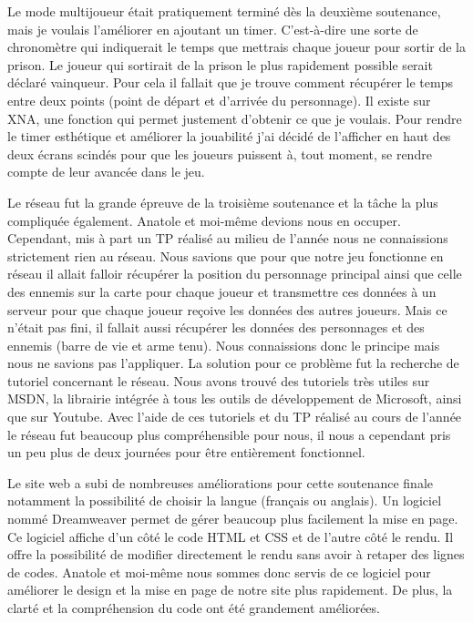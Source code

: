 \documentclass[12pt]{article}
\begin{document}
Le mode multijoueur était pratiquement terminé dès la deuxième soutenance, mais je voulais l’améliorer en ajoutant un timer. C’est-à-dire une sorte de chronomètre qui indiquerait le temps que mettrais chaque joueur pour sortir de la prison. Le joueur qui sortirait de la prison le plus rapidement possible serait déclaré vainqueur. Pour cela il fallait que je trouve comment récupérer le temps entre deux points (point de départ et d’arrivée du personnage). Il existe sur XNA, une fonction qui permet justement d’obtenir ce que je voulais. Pour rendre le timer esthétique et améliorer la jouabilité j’ai décidé de l’afficher en haut des deux écrans scindés pour que les joueurs puissent à, tout moment, se rendre compte de leur avancée dans le jeu.

Le réseau fut la grande épreuve de la troisième soutenance et la tâche la plus compliquée également. Anatole et moi-même devions nous en occuper. Cependant, mis à part un TP réalisé au milieu de l’année nous ne connaissions strictement rien au réseau. Nous savions que pour que notre jeu fonctionne en réseau il allait falloir récupérer la position du personnage principal ainsi que celle des ennemis sur la carte pour chaque joueur et transmettre ces données à un serveur pour que chaque joueur reçoive les données des autres joueurs. Mais ce n’était pas fini, il fallait aussi récupérer les données des personnages et des ennemis (barre de vie et arme tenu). Nous connaissions donc le principe mais nous ne savions pas l’appliquer. La solution pour ce problème fut la recherche de tutoriel concernant le réseau. Nous avons trouvé des tutoriels très utiles sur MSDN, la librairie intégrée à tous les outils de développement de Microsoft, ainsi que sur Youtube. Avec l’aide de ces tutoriels et du TP réalisé au cours de l’année le réseau fut beaucoup plus compréhensible pour nous, il nous a cependant pris un peu plus de deux journées pour être entièrement fonctionnel.

Le site web a subi de nombreuses améliorations pour cette soutenance finale notamment la possibilité de choisir la langue (français ou anglais). Un logiciel nommé Dreamweaver permet de gérer beaucoup plus facilement la mise en page. Ce logiciel affiche d’un côté le code HTML et CSS et de l’autre côté le rendu. Il offre la possibilité de modifier directement le rendu sans avoir à retaper des lignes de codes. Anatole et moi-même nous sommes donc servis de ce logiciel pour améliorer le design et la mise en page de notre site plus rapidement. De plus, la clarté et la compréhension du code ont été grandement améliorées.
\end{document}

